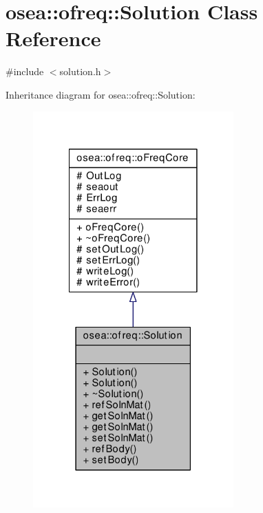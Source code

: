 \hypertarget{classosea_1_1ofreq_1_1_solution}{\section{osea\-:\-:ofreq\-:\-:Solution Class Reference}
\label{classosea_1_1ofreq_1_1_solution}
}


{\ttfamily \#include $<$solution.\-h$>$}



Inheritance diagram for osea\-:\-:ofreq\-:\-:Solution\-:\nopagebreak
\begin{figure}[H]
\begin{center}
\leavevmode
\includegraphics[width=218pt]{classosea_1_1ofreq_1_1_solution__inherit__graph}
\end{center}
\end{figure}
